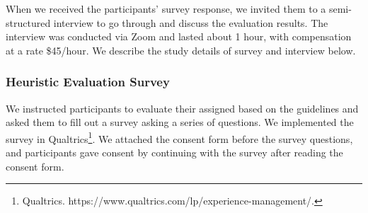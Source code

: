 When we received the participants' survey response, we invited them to a semi-structured interview to go through and discuss the evaluation results. The interview was conducted via Zoom and lasted about 1 hour, with compensation at a rate \$45/hour. We describe the study details of survey and interview below.





\subsubsection{Heuristic Evaluation Survey}
We instructed participants to evaluate their assigned  based on the guidelines and asked them to fill out a survey asking a series of questions. We implemented the survey in Qualtrics\footnote{Qualtrics. https://www.qualtrics.com/lp/experience-management/.}. We attached the consent form before the survey questions, and participants gave consent by continuing with the survey after reading the consent form.

